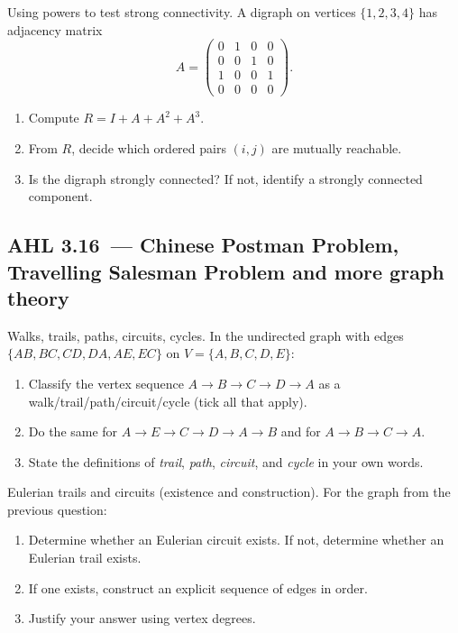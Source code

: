 \documentclass[11pt]{article}
\def\textbf#1{#1}%
\newcommand{\tocsubsection}[1]{\subsection{#1}}
\newcounter{question}
\begin{document}
\begin{question}
\textbf{Using powers to test strong connectivity.}
A digraph on vertices \(\{1,2,3,4\}\) has adjacency matrix
\[
A=\begin{pmatrix}
0&1&0&0\\
0&0&1&0\\
1&0&0&1\\
0&0&0&0
\end{pmatrix}.
\]
\begin{enumerate}
  \item Compute \(R=I+A+A^2+A^3\).  
  \item From \(R\), decide which ordered pairs \((i,j)\) are mutually reachable.  
  \item Is the digraph strongly connected? If not, identify a strongly connected component.
\end{enumerate}
\end{question}







\tocsubsection{AHL 3.16 — Chinese Postman Problem, Travelling Salesman Problem and more graph theory}


\begin{question}
\textbf{Walks, trails, paths, circuits, cycles.}
In the undirected graph with edges \\ $\{AB,BC,CD,DA,AE,EC\}$ on $V=\{A,B,C,D,E\}$:
\begin{enumerate}
  \item Classify the vertex sequence $A\!\to\!B\!\to\!C\!\to\!D\!\to\!A$ as a walk/trail/path/circuit/cycle (tick all that apply).
  \item Do the same for $A\!\to\!E\!\to\!C\!\to\!D\!\to\!A\!\to\!B$ and for $A\!\to\!B\!\to\!C\!\to\!A$.
  \item State the definitions of \emph{trail}, \emph{path}, \emph{circuit}, and \emph{cycle} in your own words.
\end{enumerate}
\end{question}

\begin{question}
\textbf{Eulerian trails and circuits (existence and construction).}
For the graph from the previous question:
\begin{enumerate}
  \item Determine whether an Eulerian circuit exists. If not, determine whether an Eulerian trail exists.
  \item If one exists, construct an explicit sequence of edges in order.
  \item Justify your answer using vertex degrees.
\end{enumerate}
\end{question}
\end{document}
